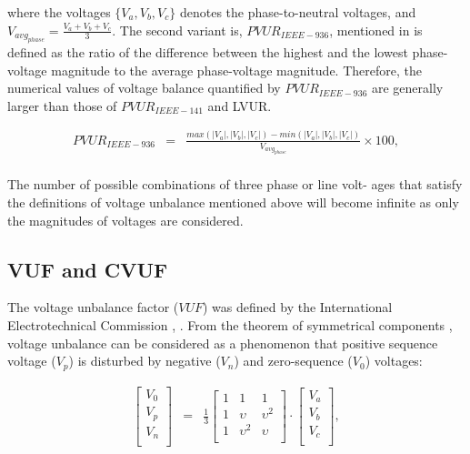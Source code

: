 where the voltages $\{V_{a},V_{b},V_{c}\}$ denotes the phase-to-neutral voltages, and $V_{avg_{phase}}=\frac{V_{a}+V_{b}+V_{c}}{3}$.
The second variant is, $PVUR_{IEEE-936}$, mentioned in \cite{IEEE_936_29053} is defined as the ratio of the difference between the highest and the lowest phase-voltage magnitude to the average phase-voltage magnitude. Therefore, the numerical values of voltage balance quantified by $PVUR_{IEEE-936}$ are generally larger than those of $PVUR_{IEEE-141}$ and LVUR. 

\begin{equation}
        \begin{array}{rcl}
            PVUR_{IEEE-936}&=&\frac{max\left( |V_a|,|V_b|,|V_c| \right)-min\left( |V_a|,|V_b|,|V_c| \right)}{V_{avg_{phase}}}\times100,\\					
        \end{array}
        \label{BASICUNB:equ:PVUR-936}
    \end{equation}
		
The number of possible combinations of three phase or line volt- ages that satisfy the definitions of voltage unbalance mentioned above will become infinite as only the magnitudes of voltages are considered.	
		
	
	\subsection{VUF and CVUF}\label{BASICUNB:sec:VUFCVUF}
	
	The voltage unbalance factor ($VUF$) was defined by the International Electrotechnical Commission \cite{pillay2001definitions}, \cite{dugan1996electrical}. From the theorem of symmetrical components \cite{fortescue1918method}, voltage unbalance can be considered as a phenomenon that positive sequence voltage  ($V_p$) is disturbed by negative  ($V_n$) and zero-sequence ($V_0$) voltages:
	
	\begin{equation}
        \begin{array}{rcl}
            \begin{bmatrix}
						V_0\\
						V_p\\
						V_n\\
						\end{bmatrix}&=&
						\frac{1}{3}\begin{bmatrix}
						1&1&1\\
						1&\upsilon&\upsilon^2\\
						1&\upsilon^2&\upsilon\\
						\end{bmatrix}\cdot
						\begin{bmatrix}
						V_a\\
						V_b\\
						V_c\\
						\end{bmatrix},\\
        \end{array}
        \label{BASICUNB:equ:symmetry}
    \end{equation}
	
